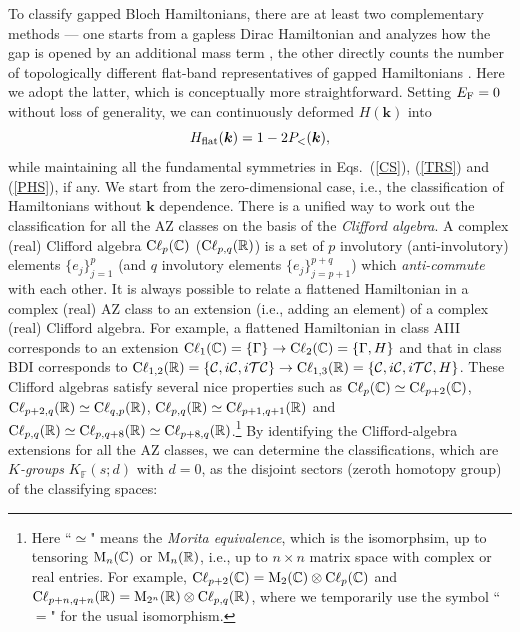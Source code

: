 \documentclass{tADP2e}
\theoremstyle{plain}
\theoremstyle{plain}
\theoremstyle{definition}
\begin{document}
To classify gapped Bloch Hamiltonians, there are at least two complementary methods --- one starts from a gapless Dirac Hamiltonian and analyzes how the gap is opened by an additional mass term \cite{SAP08}, the other directly counts the number of topologically different flat-band representatives of gapped Hamiltonians \cite{AK09}. Here we adopt the latter, which is conceptually more straightforward. Setting $E_{\rm F}=0$ without loss of generality, we can continuously deformed $H(\boldsymbol{k})$  into \cite{AK09}
\begin{equation}
H_{\rm flat}(\boldsymbol{k})=1-2P_<(\boldsymbol{k}),
\label{Hflat} 
\end{equation}
while maintaining all the fundamental symmetries in Eqs.~(\ref{CS}), (\ref{TRS}) and (\ref{PHS}), if any. We start from the zero-dimensional case, i.e., the classification of Hamiltonians without $\boldsymbol{k}$ dependence. There is a unified way to work out the classification for all the AZ classes on the basis of the \emph{Clifford algebra}. A complex (real) Clifford algebra ${\rm C}\ell_p(\mathbb{C})$ (${\rm C}\ell_{p,q}(\mathbb{R})$) is a set of $p$ involutory (anti-involutory) elements $\{e_j\}^p_{j=1}$ (and $q$ involutory elements $\{e_j\}^{p+q}_{j=p+1}$) which \emph{anti-commute} with each other. It is always possible to relate a flattened Hamiltonian in a complex (real) AZ class to an extension (i.e., adding an element) of a complex (real) Clifford algebra. For example, a flattened Hamiltonian in class AIII corresponds to an extension ${\rm C}\ell_1(\mathbb{C})=\{\Gamma\}\to {\rm C}\ell_2(\mathbb{C})=\{\Gamma,H\}$ and that in class BDI corresponds to ${\rm C}\ell_{1,2}(\mathbb{R})=\{\mathcal{C},i\mathcal{C},i\mathcal{T}\mathcal{C}\}\to {\rm C}\ell_{1,3}(\mathbb{R})=\{\mathcal{C},i\mathcal{C},i\mathcal{T}\mathcal{C},H\}$. These Clifford algebras satisfy several nice properties such as ${\rm C}\ell_p(\mathbb{C})\simeq{\rm C}\ell_{p+2}(\mathbb{C})$, ${\rm C}\ell_{p+2,q}(\mathbb{R})\simeq{\rm C}\ell_{q,p}(\mathbb{R})$, ${\rm C}\ell_{p,q}(\mathbb{R})\simeq{\rm C}\ell_{p+1,q+1}(\mathbb{R})$ and ${\rm C}\ell_{p,q}(\mathbb{R})\simeq{\rm C}\ell_{p,q+8}(\mathbb{R})\simeq{\rm C}\ell_{p+8,q}(\mathbb{R})$.\footnote{Here ``$\simeq$" means the \emph{Morita equivalence}, which is the  isomorphsim, up to tensoring ${\rm M}_n(\mathbb{C})$ or ${\rm M}_n(\mathbb{R})$, i.e., up to $n\times n$ matrix space with complex or real entries. For example, ${\rm C}\ell_{p+2}(\mathbb{C})={\rm M}_2(\mathbb{C})\otimes{\rm C}\ell_p(\mathbb{C})$ and ${\rm C}\ell_{p+n,q+n}(\mathbb{R})={\rm M}_{2^n}(\mathbb{R})\otimes{\rm C}\ell_{p,q}(\mathbb{R})$, where we temporarily use the symbol ``$=$" for the usual isomorphism.} By identifying the Clifford-algebra extensions for all the AZ classes, we can determine the classifications, which are \emph{$K$-groups} $K_{\mathbb{F}}(s;d)$ with $d=0$, as the disjoint sectors (zeroth homotopy group) of the classifying spaces: 
\end{document}
